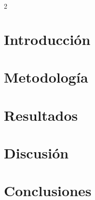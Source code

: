 \documentclass{article}
\begin{document}



\begin{multicols}{2}
	\section*{Introducción}
	

	\section*{Metodolog\'ia}
	

	\section*{Resultados}
	

	\section*{Discusi\'on}
	

	\section*{Conclusiones}
	

	
\end{multicols}
\end{document}

